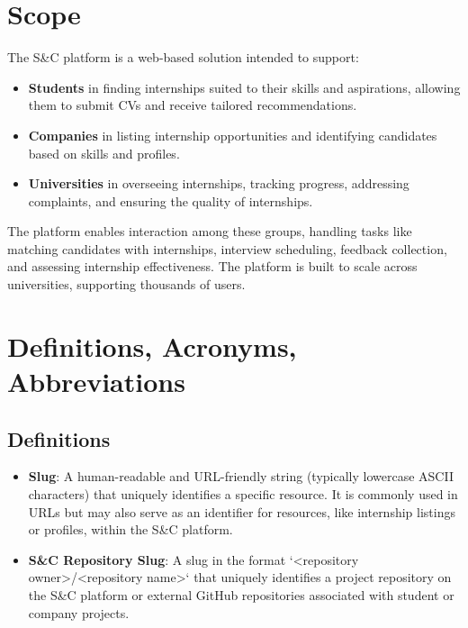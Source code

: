 \section{Scope}

The S\&C platform is a web-based solution intended to support:
\begin{itemize}
    \item \textbf{Students} in finding internships suited to their skills and aspirations, allowing them to submit CVs and receive tailored recommendations.
    \item \textbf{Companies} in listing internship opportunities and identifying candidates based on skills and profiles.
    \item \textbf{Universities} in overseeing internships, tracking progress, addressing complaints, and ensuring the quality of internships.
\end{itemize}
The platform enables interaction among these groups, handling tasks like matching candidates with internships, interview scheduling, feedback collection, and assessing internship effectiveness. The platform is built to scale across universities, supporting thousands of users.

\section{Definitions, Acronyms, Abbreviations}

\subsection{Definitions}
\begin{itemize}
    \item \textbf{Slug}: A human-readable and URL-friendly string (typically lowercase ASCII characters) that uniquely identifies a specific resource. It is commonly used in URLs but may also serve as an identifier for resources, like internship listings or profiles, within the S\&C platform.
    \item \textbf{S\&C Repository Slug}: A slug in the format `<repository owner>/<repository name>` that uniquely identifies a project repository on the S\&C platform or external GitHub repositories associated with student or company projects.
\end{itemize}

